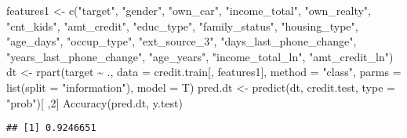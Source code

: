 \documentclass[
]{article}
\newenvironment{Shaded}{\begin{snugshade}}{\end{snugshade}}
\newcommand{\AttributeTok}[1]{\textcolor[rgb]{0.77,0.63,0.00}{#1}}
\newcommand{\DecValTok}[1]{\textcolor[rgb]{0.00,0.00,0.81}{#1}}
\newcommand{\FunctionTok}[1]{\textcolor[rgb]{0.00,0.00,0.00}{#1}}
\newcommand{\NormalTok}[1]{#1}
\newcommand{\OtherTok}[1]{\textcolor[rgb]{0.56,0.35,0.01}{#1}}
\newcommand{\SpecialCharTok}[1]{\textcolor[rgb]{0.00,0.00,0.00}{#1}}
\newcommand{\StringTok}[1]{\textcolor[rgb]{0.31,0.60,0.02}{#1}}
\begin{document}
\begin{Shaded}
\begin{Highlighting}[]
\NormalTok{features1 }\OtherTok{\textless{}{-}} \FunctionTok{c}\NormalTok{(}\StringTok{"target"}\NormalTok{, }\StringTok{"gender"}\NormalTok{, }\StringTok{"own\_car"}\NormalTok{, }\StringTok{"income\_total"}\NormalTok{, }\StringTok{"own\_realty"}\NormalTok{, }\StringTok{"cnt\_kids"}\NormalTok{, }\StringTok{"amt\_credit"}\NormalTok{, }\StringTok{"educ\_type"}\NormalTok{, }\StringTok{"family\_status"}\NormalTok{, }\StringTok{"housing\_type"}\NormalTok{, }\StringTok{"age\_days"}\NormalTok{, }\StringTok{"occup\_type"}\NormalTok{, }\StringTok{"ext\_source\_3"}\NormalTok{, }\StringTok{"days\_last\_phone\_change"}\NormalTok{, }\StringTok{"years\_last\_phone\_change"}\NormalTok{, }\StringTok{"age\_years"}\NormalTok{, }\StringTok{"income\_total\_ln"}\NormalTok{, }\StringTok{"amt\_credit\_ln"}\NormalTok{)}
\NormalTok{dt }\OtherTok{\textless{}{-}} \FunctionTok{rpart}\NormalTok{(target }\SpecialCharTok{\textasciitilde{}}\NormalTok{ ., }
            \AttributeTok{data =}\NormalTok{ credit.train[, features1],}
            \AttributeTok{method =} \StringTok{"class"}\NormalTok{,}
            \AttributeTok{parms =} \FunctionTok{list}\NormalTok{(}\AttributeTok{split =} \StringTok{"information"}\NormalTok{),}
            \AttributeTok{model =}\NormalTok{ T)}
\NormalTok{pred.dt }\OtherTok{\textless{}{-}} \FunctionTok{predict}\NormalTok{(dt, credit.test, }\AttributeTok{type =} \StringTok{"prob"}\NormalTok{)[ ,}\DecValTok{2}\NormalTok{]}
\FunctionTok{Accuracy}\NormalTok{(pred.dt, y.test)}
\end{Highlighting}
\end{Shaded}

\begin{verbatim}
## [1] 0.9246651
\end{verbatim}
\end{document}
